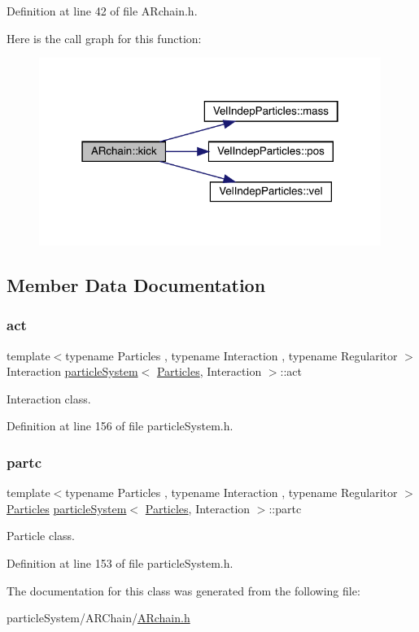 Definition at line 42 of file A\+Rchain.\+h.

Here is the call graph for this function\+:\nopagebreak
\begin{figure}[H]
\begin{center}
\leavevmode
\includegraphics[width=315pt]{class_a_rchain_a2def151c2de7790ebb1696dddac623e3_cgraph}
\end{center}
\end{figure}


\subsection{Member Data Documentation}
\mbox{\label{class_a_rchain_a41e5c73bc46164302db25b5c5d28aedd}} 
\subsubsection{\texorpdfstring{act}{act}}
{\footnotesize\ttfamily template$<$typename Particles , typename Interaction , typename Regularitor $>$ \\
Interaction \mbox{\hyperlink{classparticle_system}{particle\+System}}$<$ \mbox{\hyperlink{struct_particles}{Particles}}, Interaction $>$\+::act}



Interaction class. 



Definition at line 156 of file particle\+System.\+h.

\mbox{\label{class_a_rchain_a48cb24fbd9d72503a5e464a02760e814}} 
\subsubsection{\texorpdfstring{partc}{partc}}
{\footnotesize\ttfamily template$<$typename Particles , typename Interaction , typename Regularitor $>$ \\
\mbox{\hyperlink{struct_particles}{Particles}} \mbox{\hyperlink{classparticle_system}{particle\+System}}$<$ \mbox{\hyperlink{struct_particles}{Particles}}, Interaction $>$\+::partc}



Particle class. 



Definition at line 153 of file particle\+System.\+h.



The documentation for this class was generated from the following file\+:\begin{DoxyCompactItemize}
\item 
particle\+System/\+A\+R\+Chain/\mbox{\hyperlink{_a_rchain_8h}{A\+Rchain.\+h}}\end{DoxyCompactItemize}
